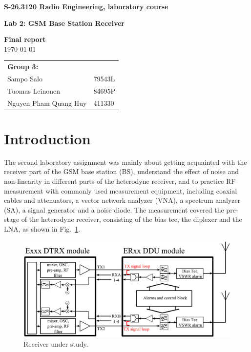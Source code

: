 \documentclass[a4paper, 12pt]{article}
\begin{document}
\begin{titlepage}
\pagestyle{empty}
\begin{center}

\vspace*{3cm}
\noindent\LARGE{\textbf{S-26.3120 Radio Engineering, laboratory course}}

\vspace*{2cm}

\Large{\textbf{Lab 2: GSM Base Station Receiver}}\\

\vspace*{1.5cm}

\large{\textbf{Final report}}\\
\vspace{1.5cm}
\large{\today}
	
\vspace*{3cm}
\large{
	\begin{tabular}{l l}
		\textbf{Group 3:} 	& \\
		Sampo Salo			& 79543L	\\
		Tuomas Leinonen 	& 84695P	\\
		Nguyen Pham Quang Huy			& 411330		
	\end{tabular}
}

\end{center}

\end{titlepage}


\section{Introduction}

The second laboratory assignment was mainly about getting acquainted with the receiver 
part of the GSM base station (BS), understand the effect of noise and non-linearity in 
different parts of the heterodyne receiver, and to practice RF measurement with commonly 
used measurement equipment, including coaxial cables and attenuators, a vector network 
analyzer (VNA), a spectrum analyzer (SA), a signal generator and a noise diode. The 
measurement covered the pre-stage of the heterodyne receiver, consisting of the bias 
tee, the diplexer and the LNA, as shown in Fig.~\ref{f:bs}.

\begin{figure}[h!]
	\begin{center}
	\includegraphics[scale=0.3]{img/bs.jpg}
	\caption{Receiver under study.}
	\label{f:bs}
	\end{center}
	\vspace*{-12pt}
\end{figure}
\end{document}
